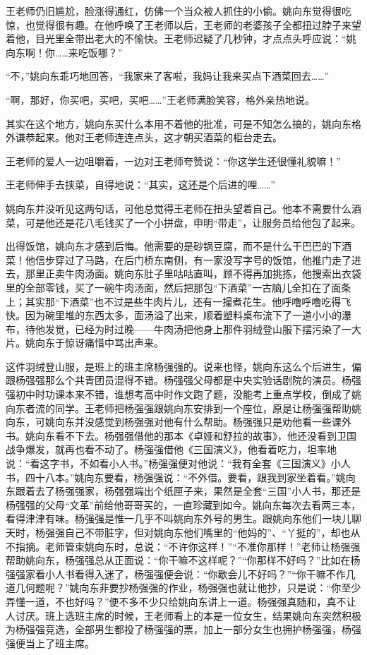 \par 王老师仍旧尴尬，脸涨得通红，仿佛一个当众被人抓住的小偷。姚向东觉得很吃惊，也觉得很有趣。在他呼唤了王老师以后，王老师的老婆孩子全都扭过脖子来望着他，目光里全带出老大的不愉快。王老师迟疑了几秒钟，才点点头呼应说：“姚向东啊！你……来吃饭哪？”
\par “不，”姚向东乖巧地回答，“我家来了客啦，我妈让我来买点下酒菜回去……”
\par “啊，那好，你买吧，买吧，买吧……”王老师满脸笑容，格外亲热地说。
\par 其实在这个地方，姚向东买什么本用不着他的批准，可是不知怎么搞的，姚向东格外谦恭起来。他对王老师连连点头，这才朝买酒菜的柜台走去。
\par 王老师的爱人一边咀嚼着，一边对王老师夸赞说：“你这学生还很懂礼貌嘛！”
\par 王老师伸手去挟菜，自得地说：“其实，这还是个后进的哩……”
\par 姚向东并没听见这两句话，可他总觉得王老师在扭头望着自己。他本不需要什么酒菜，可是他还是花八毛钱买了一个小拼盘，申明“带走”，让服务员给他包了起来。
\par 出得饭馆，姚向东才感到后悔。他需要的是砂锅豆腐，而不是什么干巴巴的下酒菜！他信步穿过了马路，在后门桥东南侧，有一家没写字号的饭馆，他推门走了进去，那里正卖牛肉汤面。姚向东肚子里咕咕直叫，顾不得再加挑拣，他搜索出衣袋里的全部零钱，买了一碗牛肉汤面，然后把那包“下酒菜”一古脑儿全扣在了面条上；其实那“下酒菜”也不过是些牛肉片儿，还有一撮煮花生。他呼噜呼噜吃得飞快。因为碗里堆的东西太多，面汤溢了出来，顺着塑料桌布流下了一道小小的瀑布，待他发觉，已经为时过晚——牛肉汤把他身上那件羽绒登山服下摆污染了一大片。姚向东于惊讶痛惜中骂出声来。
\par 这件羽绒登山服，是班上的班主席杨强强的。说来也怪，姚向东这么个后进生，偏跟杨强强那么个共青团员混得不错。杨强强父母都是中央实验话剧院的演员。杨强强初中时功课本来不错，谁想考高中时作文跑了题，没能考上重点学校，倒成了姚向东者流的同学。王老师把杨强强跟姚向东安排到一个座位，原是让杨强强帮助姚向东，可姚向东并没感觉到杨强强对他有什么帮助。杨强强只是劝他看一些课外书。姚向东看不下去。杨强强借他的那本《卓娅和舒拉的故事》，他还没看到卫国战争爆发，就再也看不动了。杨强强借他《三国演义》，他看着吃力，坦率地说：“看这字书，不如看小人书。”杨强强便对他说：“我有全套《三国演义》小人书，四十八本。”姚向东要看，杨强强说：“不外借。要看，跟我到家坐着看。”姚向东跟着去了杨强强家，杨强强端出个纸匣子来，果然是全套“三国”小人书，那还是杨强强的父母“文革”前给他哥哥买的，一直珍藏到如今。姚向东每次去看两三本，看得津津有味。杨强强是惟一几乎不叫姚向东外号的男生。跟姚向东他们一块儿聊天时，杨强强自己不带脏字，但对姚向东他们嘴里的“他妈的”、“丫挺的”，却也从不指摘。老师管束姚向东时，总说：“不许你这样！”“不准你那样！”老师让杨强强帮助姚向东，杨强强总从正面说：“你干嘛不这样呢？”“你那样不好吗？”比如在杨强强家看小人书看得入迷了，杨强强便会说：“你歇会儿不好吗？”“你干嘛不作几道几何题呢？”姚向东非要抄杨强强的作业，杨强强也就让他抄，只是说：“你至少弄懂一道，不也好吗？”便不多不少只给姚向东讲上一道。杨强强真随和，真不让人讨厌。班上选班主席的时候，王老师看上的本是一位女生，结果姚向东突然积极为杨强强竞选，全部男生都投了杨强强的票，加上一部分女生也拥护杨强强，杨强强便当上了班主席。
